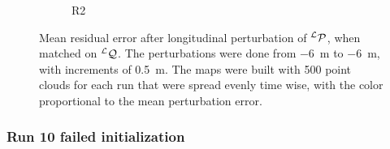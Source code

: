 \begin{figure}[h!]
\begin{center}
\begin{subfigure}[b]{0.065\textwidth}
			\label{fig:R2_pert}
			\caption{R2}
		\end{subfigure}%
		\caption{Mean residual error after longitudinal perturbation of $^{\mathcal{L}} \mathcal{P}$, when matched on $^{\mathcal{L}} \mathcal{Q}$.
		The perturbations were done from \SI{-6}{m} to \SI{-6}{m}, with increments of \SI{0.5}{m}.
		The maps were built with 500 point clouds for each run that were spread evenly time wise, with the color proportional to the mean perturbation error.
		} 
		\label{fig:forest_canyon}
	\end{center}
\end{figure}

\subsubsection{Run 10 failed initialization}
\label{sec:laverdiere_fail}

\lightlipsum[1]

